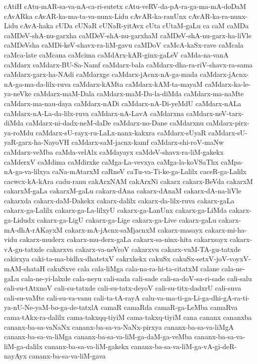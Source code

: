 {cAtiH
cAtu-mAR-sa-va-nA-ca-ri-sutetx
cAtu-veRV-da-pA-ra-ga-ma-mA-doDaM
cAvARka
cAvAR-ka-ma-ta-va-nunx-Lidu
cAvAR-ka-ranUnx
cAvAR-ka-ra-nunx-Lidu
cAvA-haka
cUDa
cUNaR
cUNaR-yitAvx
cUta
cUtaM-gaLu
ca
caM
caMDa
caMDeV-shA-nu-garxha
caMDeV-shA-nu-garxhaM
caMDeV-shA-nu-garx-ha-liVle
caMDeVsha
caMDi-keV-shavx-ra-liM-gavu
caMDoV
caMcA-kaSx-rave
caMcala
caMca-late
caMcana
caMcima
caMdArx-kAR-ginx-gaLeV
caMda-na-vanA
caMdarx
caMdarx-BU-Sa-Namf
caMdarx-bala
caMdarx-dha-ra-riV-shavx-ra-sama
caMdarx-garx-ha-NAdi
caMdarxge
caMdarx-jAcnx-nA-ga-mada
caMdarx-jAcnx-nA-ga-ma-da-lilx-ruva
caMdarx-kAMta
caMdarx-kAM-ta-mayaM
caMdarx-ka-le-ya-neVke
caMdarx-maM-Dala
caMdarx-maM-Da-la-diMda
caMdarx-ma-naMte
caMdarx-ma-nau-daya
caMdarx-nADi
caMdarx-nA-Di-yeMdU
caMdarx-nALa
caMdarx-nA-La-da-lilx-ruva
caMdarx-nA-LavA
caMdarxna
caMdarx-neV-tarx-diMda
caMdarx-ni-dadx-neM-daDe
caMdarx-no-Dane
caMdarxnu
caMdarx-pirx-ya-roMdu
caMdarx-sU-rayx-ru-LaLx-nanx-kakxra
caMdarx-sUyaR
caMdarx-sU-yaR-garx-ha-NayoVH
caMdarx-saM-jacnx-kamf
caMdarx-shi-roV-maNw
caMdarx-veMba
caMda-velAlx
caMdayayx
caMdeV-shavx-ra-liM-gakekx
caMderxV
caMdima
caMdirxke
caMga-La-vevxya
caMga-la-koVSaThx
caMpa-nA-ga-va-lilxya
caNa-mAtarxM
caRneV
caTu-va-Ti-ke-ga-Lalilx
caceR-ga-Lalilx
cacwcx-kA-kAra
cadu-ranu
cakArxNAM
cakArxNi
cakarx
cakarx-BeVda
cakarxM
cakarxM-gaLa
cakarxM-gaLu
cakarx-dAna
cakarx-dAnaM
cakarx-dA-na-liVle
cakarxda
cakarx-daM-Dakekx
cakarx-dalilx
cakarx-da-lilx-ruva
cakarx-gaLa
cakarx-ga-Lalilx
cakarx-ga-La-lilxyU
cakarx-ga-LanUnx
cakarx-ga-LiMda
cakarx-ga-Lidudx
cakarx-ga-LigU
cakarx-ga-Lige
cakarx-ga-Live
cakarx-gaLu
cakarx-mA-dhA-rAKayxM
cakarx-mA-jAcnx-saMjacnxM
cakarx-masayx
cakarx-mi-ha-vidu
cakarx-muderx
cakarx-mu-derx-gaLa
cakarx-sa-ninx-hita
cakarxsayx
cakarx-vA-gu-tatxde
cakarxva
cakarx-va-neVroV
cakarxvu
cakarx-vuM-TA-gu-tatxde
cakirxya
caki-ta-ma-bidhx-dhatetxV
cakrxkekx
cakuSx
cakuSx-setxV-joV-voyxV-mAM-shataH
cakuSxve
cala
cala-liMga
cala-na-ra-hi-ta-citatxM
calane
cala-ne-gaLu
cala-ne-yi-lalxde
cala-neyu
cali-sada
cali-sade
cali-sa-doV-sa-ri-sade
cali-salu
cali-su-tAtxnoV
cali-su-tatxde
cali-su-tatx-deyoV
cali-su-titx-dadxrU
cali-suva
cali-su-vaMte
cali-su-va-vanu
cali-ta-tA-rayA
calu-va-ma-ti-ga-Li-ga-dhi-gA-ra-ti-ya-nU-Ne-yaM-bo-ga-de-tatxlA
camaR
camaRda
camaR-ga-LeMba
camaRva
cama-tAkx-ra-dalilx
cama-takxqq-tiyiM
cama-takxq-tiyiM
cana
cananx
cananxba
cananx-ba-sa-vaNaNx
cananx-ba-sa-va-NaNx-pirxya
cananx-ba-sa-va-liMgA
cananx-ba-sa-va-liMga
cananx-ba-sa-va-liM-ga-daM-ga-veMba
cananx-ba-sa-va-liM-ga-dalilx
cananx-ba-sa-va-liM-gakekx
cananx-ba-sa-va-liM-ga-vA-gi-deR-nayAyx
cananx-ba-sa-va-liM-gava
}
